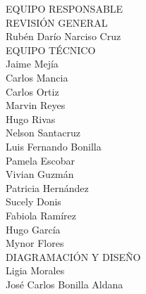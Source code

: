 {\Bold \LARGE EQUIPO RESPONSABLE}\\[2cm]
{\Bold \large \color{color1!89!black} REVISIÓN GENERAL}\\[0.2cm]
Rubén Darío Narciso Cruz\\[0.8cm]
{\Bold \large \color{color1!89!black} EQUIPO TÉCNICO}\\[0.2cm]
Jaime Mejía\\
Carlos Mancia\\
Carlos Ortiz\\
Marvin Reyes\\
Hugo Rivas\\
Nelson Santacruz \\
Luis Fernando Bonilla\\
Pamela Escobar\\
Vivian Guzmán\\
Patricia Hernández\\
Sucely Donis \\
Fabiola Ramírez \\
Hugo García \\
Mynor Flores \\[0.8cm]
{\Bold \large \color{color1!89!black} DIAGRAMACIÓN Y DISEÑO}\\[0.2cm]
Ligia Morales\\
José Carlos Bonilla Aldana